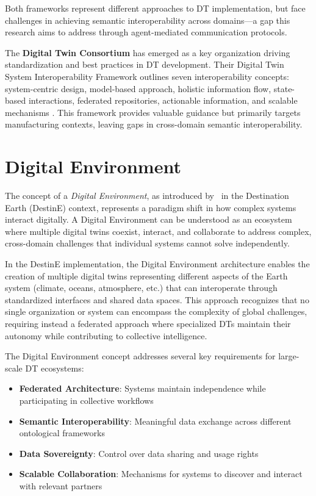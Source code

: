 Both frameworks represent different approaches to DT implementation,
    but face challenges in achieving semantic interoperability across domains—a gap 
    this research aims to address through agent-mediated communication protocols.

The \textbf{Digital Twin Consortium} has emerged as a key organization driving standardization and best practices in DT development.
Their Digital Twin System Interoperability Framework outlines seven interoperability concepts:
    system-centric design,
    model-based approach,
    holistic information flow,
    state-based interactions,
    federated repositories,
    actionable information, and
    scalable mechanisms \cite{Budiardjo_2021}.
This framework provides valuable guidance but primarily targets manufacturing contexts,
    leaving gaps in cross-domain semantic interoperability.

\section{Digital Environment}

The concept of a \emph{Digital Environment}, as introduced by~\cite{Nativi_2021} in the Destination Earth (DestinE) context, represents
    a paradigm shift in how complex systems interact digitally.
A Digital Environment can be understood as an ecosystem where multiple digital twins coexist, interact, and collaborate 
    to address complex, cross-domain challenges that individual systems cannot solve independently.

In the DestinE implementation, the Digital Environment architecture enables the creation of multiple digital twins
    representing different aspects of the Earth system (climate, oceans, atmosphere, etc.) that can
    interoperate through standardized interfaces and shared data spaces.
This approach recognizes that no single organization or system can encompass the complexity of global challenges,
    requiring instead a federated approach where specialized DTs maintain their autonomy
    while contributing to collective intelligence.

The Digital Environment concept addresses several key requirements for large-scale DT ecosystems:
\begin{itemize}
    \item \textbf{Federated Architecture}: Systems maintain independence while participating in collective workflows
    \item \textbf{Semantic Interoperability}: Meaningful data exchange across different ontological frameworks
    \item \textbf{Data Sovereignty}: Control over data sharing and usage rights
    \item \textbf{Scalable Collaboration}: Mechanisms for systems to discover and interact with relevant partners
\end{itemize}

